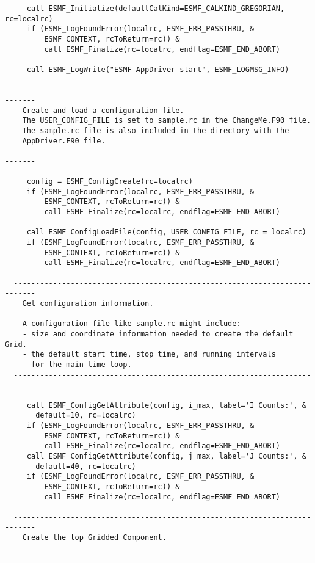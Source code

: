 \begin{verbatim}
     call ESMF_Initialize(defaultCalKind=ESMF_CALKIND_GREGORIAN, rc=localrc)
     if (ESMF_LogFoundError(localrc, ESMF_ERR_PASSTHRU, &
         ESMF_CONTEXT, rcToReturn=rc)) &
         call ESMF_Finalize(rc=localrc, endflag=ESMF_END_ABORT)
 
     call ESMF_LogWrite("ESMF AppDriver start", ESMF_LOGMSG_INFO)
 
  ---------------------------------------------------------------------------
    Create and load a configuration file.
    The USER_CONFIG_FILE is set to sample.rc in the ChangeMe.F90 file.
    The sample.rc file is also included in the directory with the
    AppDriver.F90 file.
  ---------------------------------------------------------------------------
 
     config = ESMF_ConfigCreate(rc=localrc)
     if (ESMF_LogFoundError(localrc, ESMF_ERR_PASSTHRU, &
         ESMF_CONTEXT, rcToReturn=rc)) &
         call ESMF_Finalize(rc=localrc, endflag=ESMF_END_ABORT)
 
     call ESMF_ConfigLoadFile(config, USER_CONFIG_FILE, rc = localrc)
     if (ESMF_LogFoundError(localrc, ESMF_ERR_PASSTHRU, &
         ESMF_CONTEXT, rcToReturn=rc)) &
         call ESMF_Finalize(rc=localrc, endflag=ESMF_END_ABORT)
 
  ---------------------------------------------------------------------------
    Get configuration information.
  
    A configuration file like sample.rc might include:
    - size and coordinate information needed to create the default Grid.
    - the default start time, stop time, and running intervals
      for the main time loop.
  ---------------------------------------------------------------------------
 
     call ESMF_ConfigGetAttribute(config, i_max, label='I Counts:', &
       default=10, rc=localrc)
     if (ESMF_LogFoundError(localrc, ESMF_ERR_PASSTHRU, &
         ESMF_CONTEXT, rcToReturn=rc)) &
         call ESMF_Finalize(rc=localrc, endflag=ESMF_END_ABORT)
     call ESMF_ConfigGetAttribute(config, j_max, label='J Counts:', &
       default=40, rc=localrc)
     if (ESMF_LogFoundError(localrc, ESMF_ERR_PASSTHRU, &
         ESMF_CONTEXT, rcToReturn=rc)) &
         call ESMF_Finalize(rc=localrc, endflag=ESMF_END_ABORT)
 
  ---------------------------------------------------------------------------
    Create the top Gridded Component.
  ---------------------------------------------------------------------------
 

\end{verbatim}
